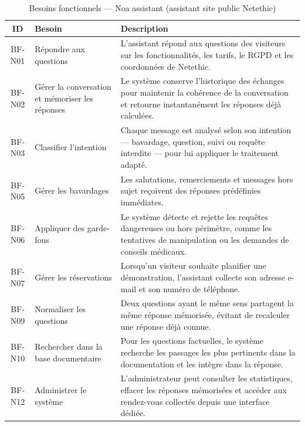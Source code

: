 \vspace{6pt}
\begin{table}[H]
\caption{Besoins fonctionnels — Noa assistant (assistant site public Netethic)}
\label{tab:bf_Noa assistant}
\centering
\small
\setlength{\tabcolsep}{4pt}
\begin{tabular}{|c|p{3.5cm}|p{9.5cm}|}
\hline
\textbf{ID} & \textbf{Besoin} & \textbf{Description} \\
\hline
BF-N01 & Répondre aux questions
        & L'assistant répond aux questions des visiteurs sur les fonctionnalités, les tarifs, le RGPD et les coordonnées de Netethic. \\
\hline
BF-N02 & Gérer la conversation et mémoriser les réponses
        & Le système conserve l'historique des échanges pour maintenir la cohérence de la conversation et retourne instantanément les réponses déjà calculées. \\
\hline
BF-N03 & Classifier l'intention
        & Chaque message est analysé selon son intention — bavardage, question, suivi ou requête interdite — pour lui appliquer le traitement adapté. \\
\hline
BF-N05 & Gérer les bavardages
        & Les salutations, remerciements et messages hors sujet reçoivent des réponses prédéfinies immédiates. \\
\hline
BF-N06 & Appliquer des garde-fous
        & Le système détecte et rejette les requêtes dangereuses ou hors périmètre, comme les tentatives de manipulation ou les demandes de conseils médicaux. \\
\hline
BF-N07 & Gérer les réservations
        & Lorsqu'un visiteur souhaite planifier une démonstration, l'assistant collecte son adresse e-mail et son numéro de téléphone. \\
\hline
BF-N09 & Normaliser les questions
        & Deux questions ayant le même sens partagent la même réponse mémorisée, évitant de recalculer une réponse déjà connue. \\
\hline
BF-N10 & Rechercher dans la base documentaire
        & Pour les questions factuelles, le système recherche les passages les plus pertinents dans la documentation et les intègre dans la réponse. \\
\hline
BF-N12 & Administrer le système
        & L'administrateur peut consulter les statistiques, effacer les réponses mémorisées et accéder aux rendez-vous collectés depuis une interface dédiée. \\
\hline
\end{tabular}
\end{table}

